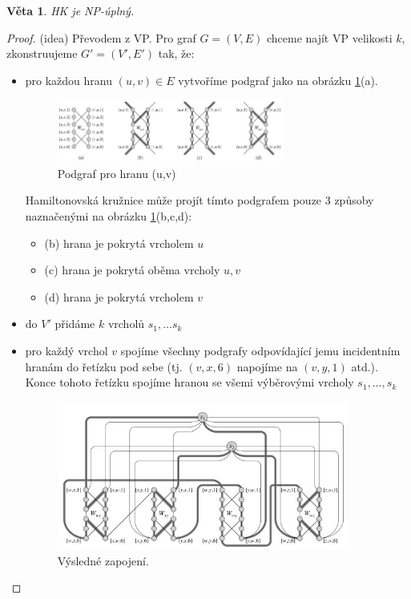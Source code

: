 \documentclass[11pt]{report} %
\newtheorem{theorem}{Věta}[section]
\numberwithin{equation}{section}
\begin{document}
\begin{theorem}
	HK je NP-úplný.
\end{theorem}
\begin{proof}(idea)
Převodem z VP. Pro graf $G = (V,E)$ chceme najít VP velikosti $k$, zkonstruujeme $G' = (V', E')$ tak, že:
\begin{itemize}
	\item pro každou hranu $(u,v) \in E$ vytvoříme podgraf jako na obrázku \ref{ham1}(a).
	\begin{figure}[H]
		\centering
		\includegraphics[width=0.7\textwidth]{img/hamilton1.jpg}
		\caption{Podgraf pro hranu (u,v)}
		\label{ham1}
	\end{figure}
	Hamiltonovská kružnice může projít tímto podgrafem pouze 3 způsoby naznačenými na obrázku \ref{ham1}(b,c,d): 
	\begin{itemize}
		\item (b) hrana je pokrytá vrcholem $u$
		\item (c) hrana je pokrytá oběma vrcholy $u, v$
		\item (d) hrana je pokrytá vrcholem $v$
	\end{itemize}

	\item do $V'$ přidáme $k$  vrcholů $s_1, \dots s_k$
	
	\item pro každý vrchol $v$ spojíme všechny podgrafy odpovídající jemu incidentním hranám do řetízku pod sebe (tj. $(v,x,6)$ napojíme na $(v,y,1)$ atd.). Konce tohoto řetízku spojíme hranou se všemi výběrovými vrcholy $s_1, \dots, s_k$
	
	\begin{figure}[H]
		\centering
		\includegraphics[width=0.9\textwidth]{img/hamilton2.jpg}
		\caption{Výsledné zapojení.}
		\label{ham2}
	\end{figure}
\end{itemize}
\end{proof}
\end{document}
